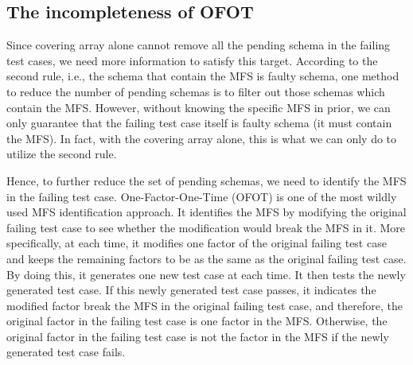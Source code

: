 
\subsection{The incompleteness of OFOT}
Since covering array alone cannot remove all the pending schema in the failing test cases, we need more information to satisfy this target.  According to the second rule, i.e., the schema that contain the MFS is faulty schema, one method to reduce the number of pending schemas is to filter out those schemas which contain the MFS. However, without knowing the specific MFS in prior, we can only guarantee that the failing test case itself is faulty schema (it must contain the MFS). In fact, with the covering array alone, this is what we can only do to utilize the second rule.

Hence, to further reduce the set of pending schemas, we need to identify the MFS in the failing test case. One-Factor-One-Time (OFOT) \cite{nie2011minimal} is one of the most wildly used MFS identification approach. It identifies the MFS by modifying the original failing test case to see whether the modification would break the MFS in it. More specifically, at each time, it modifies one factor of the original failing test case and keeps the remaining factors to be as the same as the original failing test case. By doing this, it generates one new test case at each time. It then tests the newly generated test case. If this newly generated test case passes, it indicates the modified factor break the MFS in the original failing test case, and therefore, the original factor in the failing test case is one factor in the MFS. Otherwise, the original factor in the failing test case is not the factor in the MFS if the newly generated test case fails.


